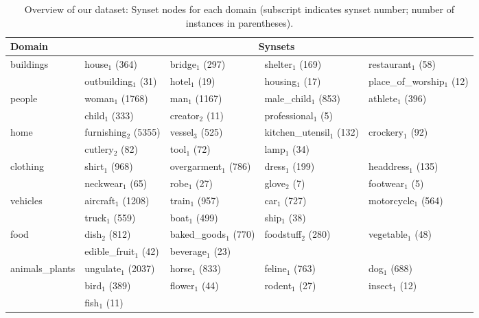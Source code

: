 \begin{table*}[htp]
	\small
	\centering
	\begin{tabular}{lllll}
			\toprule
			Domain & \multicolumn{4}{c}{Synsets}\\
			\midrule			
			buildings      &  house$_1$ (364) &  bridge$_1$ (297) &  shelter$_1$ (169) &  restaurant$_1$ (58)\\
			&  outbuilding$_1$ (31) &  hotel$_1$ (19) &  housing$_1$ (17) &  place\_of\_worship$_1$ (12)     \\
			people         &  woman$_1$ (1768) &  man$_1$ (1167) &  male\_child$_1$ (853) &  athlete$_1$ (396) \\
			&  child$_1$ (333) &  creator$_2$ (11) &  professional$_1$ (5)    \\
			home           &  furnishing$_2$ (5355) &  vessel$_3$ (525) &  kitchen\_utensil$_1$ (132) &  crockery$_1$ (92) \\
			&  cutlery$_2$ (82) &  tool$_1$ (72) &  lamp$_1$ (34)    \\
			clothing       &  shirt$_1$ (968) &  overgarment$_1$ (786) &  dress$_1$ (199) &  headdress$_1$ (135)\\
			 &  neckwear$_1$ (65) 		&  robe$_1$ (27) &  glove$_2$ (7) &  footwear$_1$ (5)    \\
			vehicles       &  aircraft$_1$ (1208) &  train$_1$ (957) &  car$_1$ (727) &  motorcycle$_1$ (564) \\
			&  truck$_1$ (559) &  boat$_1$ (499) &  ship$_1$ (38)    \\
			food           &  dish$_2$ (812) &  baked\_goods$_1$ (770) &  foodstuff$_2$ (280) &  vegetable$_1$ (48) \\
			&  edible\_fruit$_1$ (42) 	&  beverage$_1$ (23)   \\
			animals\_plants &  ungulate$_1$ (2037) &  horse$_1$ (833) &  feline$_1$ (763) &  dog$_1$ (688) \\
			&  bird$_1$ (389) &  flower$_1$ (44) &  rodent$_1$ (27) &  insect$_1$ (12) \\ 
			&  fish$_1$ (11) &   \\
			\bottomrule
		\end{tabular}
		\caption{Overview of our dataset: Synset nodes for each domain (subscript indicates synset number; number of instances in parentheses). %
			\label{tab:overview_dataset2}}
	\end{table*}
%
%
